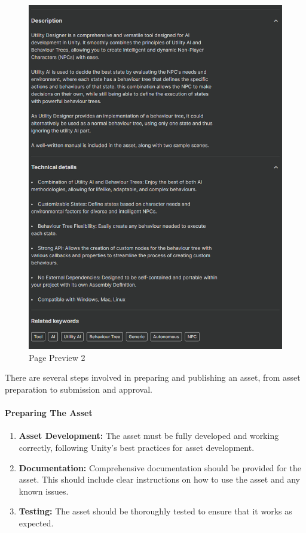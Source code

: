 \begin{figure}[H]
\begin{minipage}{0.49\textwidth}
        \includegraphics[scale=0.26]{images/asset_store_page_2.png}
        \caption{Page Preview 2}
        \label{fig:asset_store_page_2}
    \end{minipage}
\end{figure}

\newpage

There are several steps involved in preparing and publishing an asset, from asset preparation to submission and approval.

\paragraph{Preparing The Asset}

\begin{enumerate}
    \item \textbf{Asset Development:} The asset must be fully developed and working correctly, following Unity's best practices for asset development.
    \item \textbf{Documentation:} Comprehensive documentation should be provided for the asset. This should include clear instructions on how to use the asset and any known issues.
    \item \textbf{Testing:} The asset should be thoroughly tested to ensure that it works as expected.
\end{enumerate}

